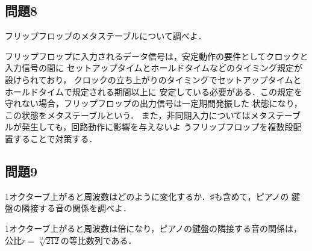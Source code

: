 \subsection*{問題8}
フリップフロップのメタステーブルについて調べよ．

フリップフロップに入力されるデータ信号は，安定動作の要件としてクロックと入力信号の間に
セットアップタイムとホールドタイムなどのタイミング規定が設けられており，
クロックの立ち上がりのタイミングでセットアップタイムとホールドタイムで規定される期間以上に
安定している必要がある．この規定を守れない場合，フリップフロップの出力信号は一定期間発振した
状態になり，この状態をメタステーブルという． 
また，非同期入力についてはメタステーブルが発生しても，回路動作に影響を与えないよ
うフリップフロップを複数段配置することで対策する．

\subsection*{問題9}
1オクターブ上がると周波数はどのように変化するか．♯も含めて，ピアノの
鍵盤の隣接する音の関係を調べよ．

1オクターブ上がると周波数は倍になり，ピアノの鍵盤の隣接する音の関係は，
公比$r=\sqrt[12]{212}$の等比数列である．